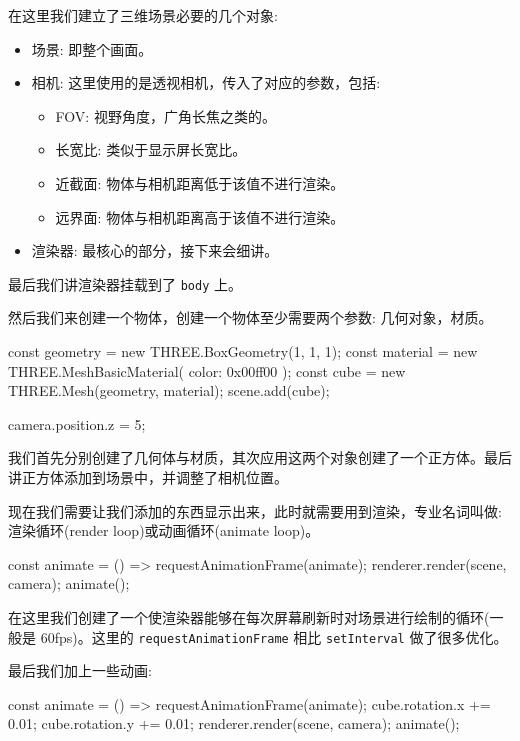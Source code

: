 在这里我们建立了三维场景必要的几个对象:
\begin{itemize}
  \item 场景: 即整个画面。
  \item 相机: 这里使用的是透视相机，传入了对应的参数，包括:
  \begin{itemize}
    \item FOV: 视野角度，广角长焦之类的。
    \item 长宽比: 类似于显示屏长宽比。
    \item 近截面: 物体与相机距离低于该值不进行渲染。
    \item 远界面: 物体与相机距离高于该值不进行渲染。
  \end{itemize}
  \item 渲染器: 最核心的部分，接下来会细讲。
\end{itemize}

最后我们讲渲染器挂载到了 \texttt{body} 上。

然后我们来创建一个物体，创建一个物体至少需要两个参数: 几何对象，材质。

\begin{JavaScript}
const geometry = new THREE.BoxGeometry(1, 1, 1);
const material = new THREE.MeshBasicMaterial({ color: 0x00ff00 });
const cube = new THREE.Mesh(geometry, material);
scene.add(cube);

camera.position.z = 5;
\end{JavaScript}

我们首先分别创建了几何体与材质，其次应用这两个对象创建了一个正方体。最后讲正方体添加到场景中，并调整了相机位置。

现在我们需要让我们添加的东西显示出来，此时就需要用到渲染，专业名词叫做: 渲染循环(render loop)或动画循环(animate loop)。

\begin{JavaScript}
const animate = () => {
  requestAnimationFrame(animate);
  renderer.render(scene, camera);
}
animate();
\end{JavaScript}

在这里我们创建了一个使渲染器能够在每次屏幕刷新时对场景进行绘制的循环(一般是 60fps)。这里的 \texttt{requestAnimationFrame} 相比 \texttt{setInterval} 做了很多优化。

最后我们加上一些动画:

\begin{JavaScript}
const animate = () => {
  requestAnimationFrame(animate);
  cube.rotation.x += 0.01;
  cube.rotation.y += 0.01;
  renderer.render(scene, camera);
}
animate();
\end{JavaScript}

